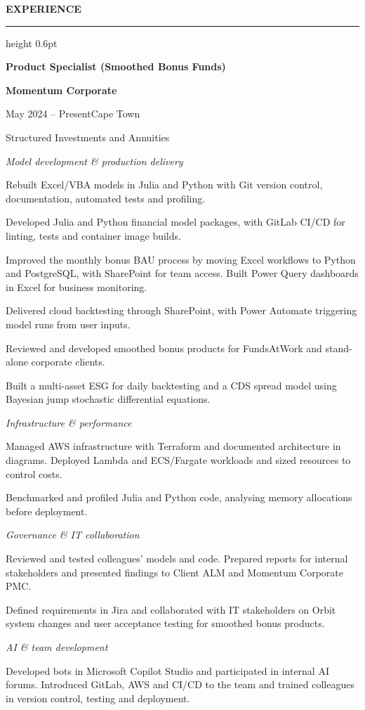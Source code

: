 \documentclass[10pt,a4paper,ragged2e,withhyper]{altacv}
\renewcommand{\cvsection}[1]{%
  \par\addvspace{0.8em}%
  {\normalsize\bfseries\color{heading}\MakeUppercase{#1}\par}%
  \nobreak\vspace{0.2em}%
  {\color{headingrule}\hrule height 0.6pt}%
  \nobreak\vspace{0.6em}%
}
\newcommand{\experiencegroup}[1]{%
  \par\addvspace{0.8em}%
  {\normalsize\mdseries\itshape\color{PrimaryColor}#1\par}%
  \nobreak\vspace{0.4em}%
}
\newenvironment{cvmain}{%
  \begin{minipage}[t]{0.675\textwidth}%
  \vspace{0pt}%
  \RaggedRight\fontsize{11}{14.5}\selectfont
}{%
  \end{minipage}%
}
\renewcommand{\cvevent}[4]{%
  {\large\bfseries\color{emphasis}#1\par}%
  {\small\bfseries\color{accent}#2\par}%
  \vspace{0.15em}%
  {\small #3\enspace\textbar\enspace #4\par}%
  \vspace{0.35em}%
}
\begin{document}
\begin{cvmain}
\cvsection{Experience}
\cvevent{Product Specialist (Smoothed Bonus Funds)}{Momentum Corporate}{May 2024 -- Present}{Cape Town}
{\small\color{MutedColor}Structured Investments and Annuities\par}

\experiencegroup{Model development \& production delivery}
\begin{cvitems}
  \item Rebuilt Excel/VBA models in Julia and Python with Git version control, documentation, automated tests and profiling.
  \item Developed Julia and Python financial model packages, with GitLab CI/CD for linting, tests and container image builds.
  \item Improved the monthly bonus BAU process by moving Excel workflows to Python and PostgreSQL, with SharePoint for team access. Built Power Query dashboards in Excel for business monitoring.
  \item Delivered cloud backtesting through SharePoint, with Power Automate triggering model runs from user inputs.
  \item Reviewed and developed smoothed bonus products for FundsAtWork and stand-alone corporate clients.
  \item Built a multi-asset ESG for daily backtesting and a CDS spread model using Bayesian jump stochastic differential equations.
\end{cvitems}

\experiencegroup{Infrastructure \& performance}
\begin{cvitems}
  \item Managed AWS infrastructure with Terraform and documented architecture in diagrams. Deployed Lambda and ECS/Fargate workloads and sized resources to control costs.
  \item Benchmarked and profiled Julia and Python code, analysing memory allocations before deployment.
\end{cvitems}

\experiencegroup{Governance \& IT collaboration}
\begin{cvitems}
  \item Reviewed and tested colleagues' models and code. Prepared reports for internal stakeholders and presented findings to Client ALM and Momentum Corporate PMC.
  \item Defined requirements in Jira and collaborated with IT stakeholders on Orbit system changes and user acceptance testing for smoothed bonus products.
\end{cvitems}

\experiencegroup{AI \& team development}
\begin{cvitems}
  \item Developed bots in Microsoft Copilot Studio and participated in internal AI forums. Introduced GitLab, AWS and CI/CD to the team and trained colleagues in version control, testing and deployment.
\end{cvitems}
\end{cvmain}
\end{document}
